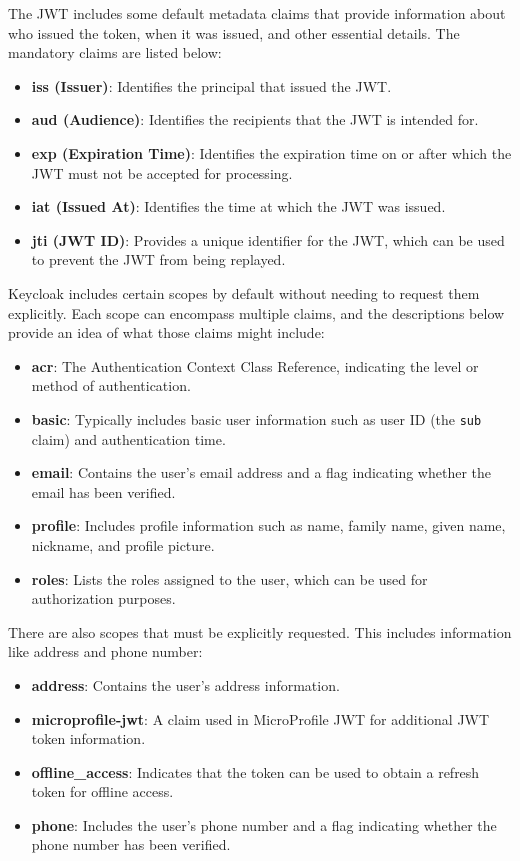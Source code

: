 The JWT includes some default metadata claims that provide information about who issued the token, when it was issued, and other essential details. The mandatory claims are listed below:

\begin{itemize} 
    \item \textbf{iss (Issuer)}: Identifies the principal that issued the JWT.
    \item \textbf{aud (Audience)}: Identifies the recipients that the JWT is intended for. 
    \item \textbf{exp (Expiration Time)}: Identifies the expiration time on or after which the JWT must not be accepted for processing. 
    \item \textbf{iat (Issued At)}: Identifies the time at which the JWT was issued. 
    \item \textbf{jti (JWT ID)}: Provides a unique identifier for the JWT, which can be used to prevent the JWT from being replayed. 
\end{itemize}

Keycloak includes certain scopes by default without needing to request them explicitly. Each scope can encompass multiple claims, and the descriptions below provide an idea of what those claims might include:

\begin{itemize} 
    \item \textbf{acr}: The Authentication Context Class Reference, indicating the level or method of authentication. 
    \item \textbf{basic}: Typically includes basic user information such as user ID (the \texttt{sub} claim) and authentication time. 
    \item \textbf{email}: Contains the user's email address and a flag indicating whether the email has been verified. 
    \item 
    \textbf{profile}: Includes profile information such as name, family name, given name, nickname, and profile picture. 
    \item \textbf{roles}: Lists the roles assigned to the user, which can be used for authorization purposes. 
\end{itemize}

There are also scopes that must be explicitly requested. This includes information like address and phone number:

\begin{itemize} 
    \item \textbf{address}: Contains the user's address information. 
    \item \textbf{microprofile-jwt}: A claim used in MicroProfile JWT for additional JWT token information. 
    \item \textbf{offline\_access}: Indicates that the token can be used to obtain a refresh token for offline access. 
    \item \textbf{phone}: Includes the user's phone number and a flag indicating whether the phone number has been verified. 
\end{itemize}


